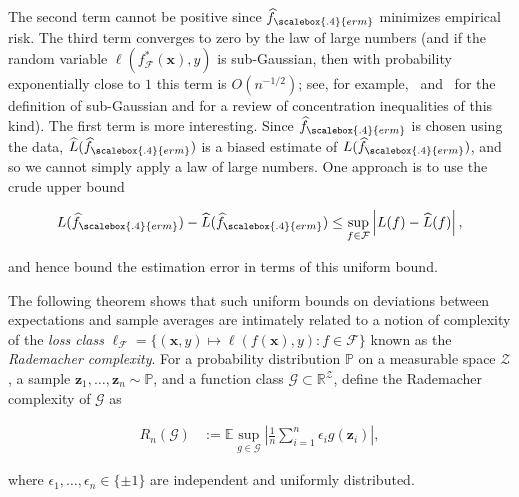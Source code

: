 The second term cannot be positive since $\widehat{f}_{\scalebox{.4}{erm}}$ minimizes empirical risk.  The third term converges to zero by the law of large numbers (and if the random variable $\ell(f_{{\mathcal F}}^*({\boldsymbol x}),y)$ is sub-Gaussian, then with probability exponentially close to $1$ this term is $O(n^{-1/2})$; see, for example,~\cite[Chapter~2]{blm-ci-13} and~\cite{v-hdp-18} for the definition of sub-Gaussian and for a review of concentration inequalities of this kind).  The first term is more interesting. Since $\widehat{f}_{\scalebox{.4}{erm}}$ is chosen using the data,
$\widehat L(\widehat{f}_{\scalebox{.4}{erm}})$ is a biased estimate of $L(\widehat{f}_{\scalebox{.4}{erm}})$,
and so we cannot simply apply a law of large numbers. One approach is to use the crude upper bound

\begin{equation}\label{eqn:loosebound}
    L(\widehat{f}_{\scalebox{.4}{erm}}) - \widehat L(\widehat{f}_{\scalebox{.4}{erm}})
      \le \sup_{f\in{\mathcal F}}\left|L(f) - \widehat L(f)\right|,
  \end{equation}

and hence bound the estimation error in terms of this uniform bound.

The following theorem shows that such uniform bounds on deviations between expectations and sample averages are intimately related to a notion of complexity of the {\em loss class} $\ell_{{\mathcal F}}=\{({\boldsymbol x},y)\mapsto
\ell(f({\boldsymbol x}),y):f\in {\mathcal F}\}$ known as the {\em Rademacher complexity}. For a probability distribution $\mathbb{P}$ on a measurable space
${\mathcal Z}$, a sample ${\boldsymbol z}_1,\ldots,{\boldsymbol z}_n\sim \mathbb{P}$, and a function class
${\mathcal G}\subset{\mathbb R}^{{\mathcal Z}}$, define the Rademacher complexity of ${\mathcal G}$ as

\begin{align*}
    R_n({\mathcal G}) &:= {\mathbb E}\sup_{g\in{\mathcal G}}
      \left|\frac{1}{n}\sum_{i=1}^n \epsilon_i g({\boldsymbol z}_i)\right|,
  \end{align*}

where $\epsilon_1,\ldots,\epsilon_n\in\{\pm 1\}$ are independent and uniformly distributed.

